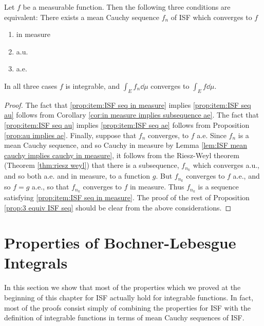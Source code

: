 \begin{proposition}
\label{prop:3 equiv ISF seq}
Let $f$ be a measurable function. Then the following three conditions are equivalent: There exists a mean Cauchy sequence $f_n$ of ISF which converges to $f$
\begin{enumerate}[label=\arabic*),ref=\arabic*)]
    \item \label{prop:item:ISF seq in measure}
    in measure
    \item \label{prop:item:ISF seq au}
    a.u.
    \item \label{prop:item:ISF seq ae}
    a.e.
\end{enumerate}
In all three cases $f$ is integrable, and $\int_Ef_n\dd\mu$ converges to $\int_Ef\dd\mu$.
\end{proposition}

\begin{proof}
The fact that \ref{prop:item:ISF seq in measure} implies \ref{prop:item:ISF seq au} follows from Corollary \ref{cor:in measure implies subsequence ae}. The fact that \ref{prop:item:ISF seq au} implies \ref{prop:item:ISF seq ae} follows from Proposition \ref{prop:au implies ae}. Finally, suppose that $f_n$ converges, to $f$ a.e. Since $f_n$ is a mean Cauchy sequence, and so Cauchy in measure by Lemma \ref{lem:ISF mean cauchy implies cauchy in measure}, it follows from the Riesz-Weyl theorem (Theorem \ref{thm:riesz weyl}) that there is a subsequence, $f_{n_k}$ which converges a.u., and so both a.e. and in measure, to a function $g$. But $f_{n_k}$ converges to $f$ a.e., and so $f=g$ a.e., so that $f_{n_k}$ converges to $f$ in measure. Thus $f_{n_k}$ is a sequence satisfying \ref{prop:item:ISF seq in measure}. The proof of the rest of Proposition \ref{prop:3 equiv ISF seq} should be clear from the above considerations.
\end{proof}

\section{Properties of Bochner-Lebesgue Integrals}

In this section we show that most of the properties which we proved at the beginning of this chapter for ISF actually hold for integrable functions. In fact, most of the proofs consist simply of combining the properties for ISF with the definition of integrable functions in terms of mean Cauchy sequences of ISF.

